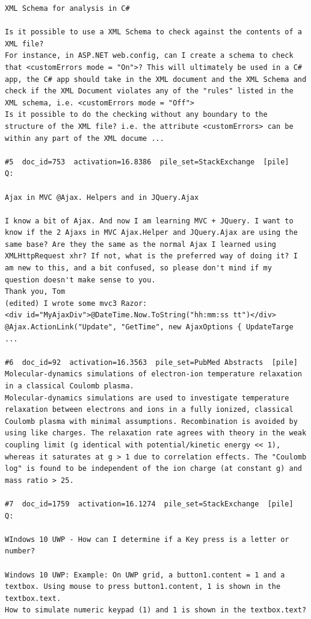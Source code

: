 \begin{verbatim}
XML Schema for analysis in C#

Is it possible to use a XML Schema to check against the contents of a XML file?
For instance, in ASP.NET web.config, can I create a schema to check that <customErrors mode = "On">? This will ultimately be used in a C# app, the C# app should take in the XML document and the XML Schema and check if the XML Document violates any of the "rules" listed in the XML schema, i.e. <customErrors mode = "Off">
Is it possible to do the checking without any boundary to the structure of the XML file? i.e. the attribute <customErrors> can be within any part of the XML docume ...

#5  doc_id=753  activation=16.8386  pile_set=StackExchange  [pile]
Q:

Ajax in MVC @Ajax. Helpers and in JQuery.Ajax

I know a bit of Ajax. And now I am learning MVC + JQuery. I want to know if the 2 Ajaxs in MVC Ajax.Helper and JQuery.Ajax are using the same base? Are they the same as the normal Ajax I learned using XMLHttpRequest xhr? If not, what is the preferred way of doing it? I am new to this, and a bit confused, so please don't mind if my question doesn't make sense to you.
Thank you, Tom
(edited) I wrote some mvc3 Razor:
<div id="MyAjaxDiv">@DateTime.Now.ToString("hh:mm:ss tt")</div>
@Ajax.ActionLink("Update", "GetTime", new AjaxOptions { UpdateTarge ...

#6  doc_id=92  activation=16.3563  pile_set=PubMed Abstracts  [pile]
Molecular-dynamics simulations of electron-ion temperature relaxation in a classical Coulomb plasma.
Molecular-dynamics simulations are used to investigate temperature relaxation between electrons and ions in a fully ionized, classical Coulomb plasma with minimal assumptions. Recombination is avoided by using like charges. The relaxation rate agrees with theory in the weak coupling limit (g identical with potential/kinetic energy << 1), whereas it saturates at g > 1 due to correlation effects. The "Coulomb log" is found to be independent of the ion charge (at constant g) and mass ratio > 25.

#7  doc_id=1759  activation=16.1274  pile_set=StackExchange  [pile]
Q:

WIndows 10 UWP - How can I determine if a Key press is a letter or number?

Windows 10 UWP: Example: On UWP grid, a button1.content = 1 and a textbox. Using mouse to press button1.content, 1 is shown in the textbox.text.
How to simulate numeric keypad (1) and 1 is shown in the textbox.text?


\end{verbatim}
